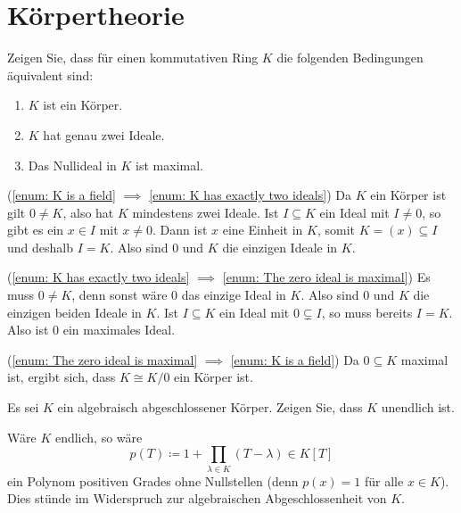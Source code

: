 \section{Körpertheorie}


\begin{question}\label{question: characterization of fields via its ideals}
  Zeigen Sie, dass für einen kommutativen Ring $K$ die folgenden Bedingungen äquivalent sind:
  \begin{enumerate}
    \item
      \label{enum: K is a field}
      $K$ ist ein Körper.
    \item
      \label{enum: K has exactly two ideals}
      $K$ hat genau zwei Ideale.
    \item
      \label{enum: The zero ideal is maximal}
      Das Nullideal in $K$ ist maximal.
  \end{enumerate}
\end{question}


\begin{solution}
  (\ref{enum: K is a field} $\implies$ \ref{enum: K has exactly two ideals})
  Da $K$ ein Körper ist gilt $0 \neq K$, also hat $K$ mindestens zwei Ideale.
  Ist $I \subseteq K$ ein Ideal mit $I \neq 0$, so gibt es ein $x \in I$ mit $x \neq 0$.
  Dann ist $x$ eine Einheit in $K$, somit $K = (x) \subseteq I$ und deshalb $I = K$.
  Also sind $0$ und $K$ die einzigen Ideale in $K$.
  
  (\ref{enum: K has exactly two ideals} $\implies$ \ref{enum: The zero ideal is maximal})
  Es muss $0 \neq K$, denn sonst wäre $0$ das einzige Ideal in $K$.
  Also sind $0$ und $K$ die einzigen beiden Ideale in $K$.
  Ist $I \subseteq K$ ein Ideal mit $0 \subsetneq I$, so muss bereits $I = K$.
  Also ist $0$ ein maximales Ideal.
  
  (\ref{enum: The zero ideal is maximal} $\implies$ \ref{enum: K is a field})
  Da $0 \subseteq K$ maximal ist, ergibt sich, dass $K \cong K/0$ ein Körper ist.
\end{solution}


\begin{question}
  Es sei $K$ ein algebraisch abgeschlossener Körper.
  Zeigen Sie, dass $K$ unendlich ist.
\end{question}


\begin{solution}
  Wäre $K$ endlich, so wäre
  \[
              p(T)
    \coloneqq 1 + \prod_{\lambda \in K} (T - \lambda)
    \in       K[T]
  \]
  ein Polynom positiven Grades ohne Nullstellen (denn $p(x) = 1$ für alle $x \in K$).
  Dies stünde im Widerspruch zur algebraischen Abgeschlossenheit von $K$.
\end{solution}


